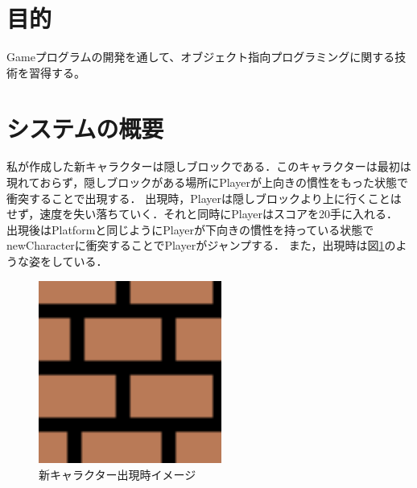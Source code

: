 \documentclass[titlepage,dvipdfmx]{jarticle}
\begin{document}
\section{目的}
Gameプログラムの開発を通して、オブジェクト指向プログラミングに関する技術を習得する。
\section{システムの概要}
私が作成した新キャラクターは隠しブロックである．このキャラクターは最初は現れておらず，隠しブロックがある場所にPlayerが上向きの慣性をもった状態で衝突することで出現する．
出現時，Playerは隠しブロックより上に行くことはせず，速度を失い落ちていく．それと同時にPlayerはスコアを20手に入れる．
出現後はPlatformと同じようにPlayerが下向きの慣性を持っている状態でnewCharacterに衝突することでPlayerがジャンプする．
また，出現時は図\ref{newCharacter}のような姿をしている．
\begin{figure}[H]
  \centering
  \includegraphics[width=6cm]{img/new_character.png}
  \caption{新キャラクター出現時イメージ}
  \label{newCharacter}
\end{figure}
\end{document}
